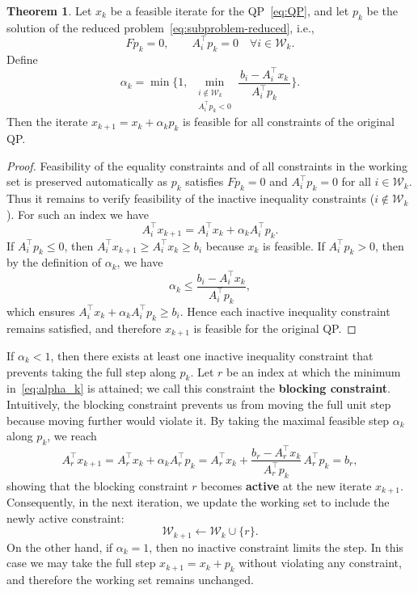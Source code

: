 \documentclass{book}
\theoremstyle{definition}
\newtheorem{theorem}{Theorem}[section]
\numberwithin{algorithm_}{chapter}
\begin{document}
\begin{theorem} \label{th:feasible-step}
Let \(x_k\) be a feasible iterate for the QP~\eqref{eq:QP}, and let \(p_k\) be the solution of the reduced problem~\eqref{eq:subproblem-reduced}, i.e., 
\[
F p_k = 0, \qquad A_i^\top p_k = 0 \quad \forall i \in \mathcal{W}_k.
\]
Define
\begin{equation} \label{eq:alpha_k}
\alpha_k
=
\min \Biggl\{
1,\;
\min_{\substack{i \notin \mathcal{W}_k \\ A_i^\top p_k < 0}}
\frac{\,b_i - A_i^\top x_k\,}{A_i^\top p_k}
\Biggr\}.
\end{equation}
Then the iterate $x_{k+1} = x_k + \alpha_k p_k$
is feasible for all constraints of the original QP.

\begin{proof}
Feasibility of the equality constraints and of all constraints in the working set is preserved automatically as \(p_k\) satisfies 
\(F p_k = 0\) and \(A_i^\top p_k = 0\) for all \(i \in \mathcal{W}_k\).  
Thus it remains to verify feasibility of the inactive inequality constraints (\(i \notin \mathcal{W}_k\)).  
For such an index we have
\[
A_i^\top x_{k+1}
= A_i^\top x_k + \alpha_k A_i^\top p_k.
\]
If \(A_i^\top p_k \le 0\), then \(A_i^\top x_{k+1} \ge A_i^\top x_k \ge b_i\) because \(x_k\) is feasible.  
If \(A_i^\top p_k > 0\), then by the definition of \(\alpha_k\), we have
\[
\alpha_k \le \frac{b_i - A_i^\top x_k}{A_i^\top p_k},
\]
which ensures \(A_i^\top x_k + \alpha_k A_i^\top p_k \ge b_i\).  
Hence each inactive inequality constraint remains satisfied, and therefore \(x_{k+1}\) is feasible for the original QP.

\end{proof}
\end{theorem}

\bigskip

If $\alpha_k < 1$, then there exists at least one inactive inequality constraint that prevents taking the full step along $p_k$. Let $r$ be an index at which the minimum in~\eqref{eq:alpha_k} is attained; we call this constraint the \textbf{blocking constraint}. Intuitively, the blocking constraint prevents us from moving the full unit step because moving further would violate it. By taking the maximal feasible step $\alpha_k$ along $p_k$, we reach
\[
A_r^\top x_{k+1} = A_r^\top x_k + \alpha_k A_r^\top p_k
= A_r^\top x_k + \frac{b_r - A_r^\top x_k}{A_r^\top p_k} \, A_r^\top p_k
= b_r,
\]
showing that the blocking constraint $r$ becomes \textbf{active} at the new iterate $x_{k+1}$.
Consequently, in the next iteration, we update the working set to include the newly active constraint:
\[
\mathcal{W}_{k+1} \gets \mathcal{W}_k \cup \{ r \}.
\]
On the other hand, if $\alpha_k = 1$, then no inactive constraint limits the step.  
In this case we may take the full step $x_{k+1} = x_k + p_k$ without violating any constraint, and therefore the working set remains unchanged.
\end{document}
